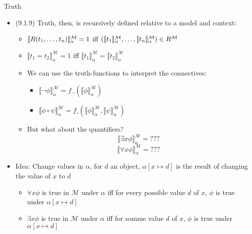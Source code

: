 \begin{frame}{Truth}

	\begin{itemize}
		
		\item (9.1.9) Truth, then, is recursively defined relative to a model and context:
		
		\begin{itemize}
		
			 \item { $\llbracket R(t_1, \mathellipsis, t_n)\rrbracket^\mathcal{M}_\alpha=1$ iff $(\llbracket t_1\rrbracket^\mathcal{M}_\alpha, \mathellipsis, \llbracket t_n\rrbracket^\mathcal{M}_\alpha)\in R^\mathcal{M}$}
				
			\item {$\llbracket t_1=t_2\rrbracket^\mathcal{M}_\alpha=1$  iff $\llbracket t_1\rrbracket^\mathcal{M}_\alpha=\llbracket t_2\rrbracket^\mathcal{M}_\alpha$}
			
			\item We can use the truth-functions to interpret the connectives: 
			\begin{itemize}
			
			\item $\llbracket \neg\phi\rrbracket^\mathcal{M}_\alpha=f_\neg(\llbracket\phi\rrbracket^\mathcal{M}_\alpha)$	
			
			\item $\llbracket\phi\circ\psi\rrbracket^\mathcal{M}_\alpha=f_\circ(\llbracket\phi\rrbracket^\mathcal{M}_\alpha,\llbracket\psi\rrbracket^\mathcal{M}_\alpha)$
			
			\end{itemize}
					
			\item But what about the quantifiers?
			\[\llbracket \exists x\phi\rrbracket^\mathcal{M}_\alpha=???\]\[\llbracket \forall x\phi\rrbracket^\mathcal{M}_\alpha=???\]
		
		\end{itemize}
		
		\item Idea: Change values in $\alpha$, for $d$ an object, $\alpha[x\mapsto d]$ is the result of changing the value of $x$ to $d$
		
		\begin{itemize}
		
			\item $\forall x\phi$ is true in $\mathcal{M}$ under $\alpha$ iff for every possible value $d$ of $x$, $\phi$ is true under $\alpha[x\mapsto d]$ 
			\item $\exists x\phi$ is true in $\mathcal{M}$ under $\alpha$ iff for somme value $d$ of $x$, $\phi$ is true under $\alpha[x\mapsto d]$ 
		
		\end{itemize}
		
	\end{itemize}

\end{frame}


